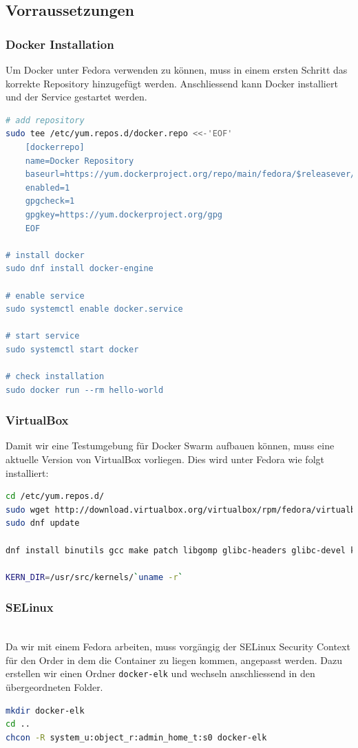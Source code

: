 \subsection{Vorraussetzungen}
\subsubsection{Docker Installation}
Um Docker unter Fedora verwenden zu können, muss in einem ersten Schritt das korrekte Repository hinzugefügt werden. Anschliessend kann Docker installiert und der Service gestartet werden.
\begin{lstlisting}[language=bash]
# add repository
sudo tee /etc/yum.repos.d/docker.repo <<-'EOF'
	[dockerrepo]
	name=Docker Repository
	baseurl=https://yum.dockerproject.org/repo/main/fedora/$releasever/
	enabled=1
	gpgcheck=1
	gpgkey=https://yum.dockerproject.org/gpg
	EOF

# install docker
sudo dnf install docker-engine

# enable service
sudo systemctl enable docker.service

# start service
sudo systemctl start docker

# check installation
sudo docker run --rm hello-world
\end{lstlisting}

\subsubsection{VirtualBox}
Damit wir eine Testumgebung für Docker Swarm aufbauen können, muss eine aktuelle Version von VirtualBox vorliegen.  Dies wird unter Fedora wie folgt installiert:
\begin{lstlisting}[language=bash]
cd /etc/yum.repos.d/ 
sudo wget http://download.virtualbox.org/virtualbox/rpm/fedora/virtualbox.repo
sudo dnf update

dnf install binutils gcc make patch libgomp glibc-headers glibc-devel kernel-headers kernel-devel dkms

KERN_DIR=/usr/src/kernels/`uname -r`
\end{lstlisting}


\subsubsection{SELinux} \hfill \\
Da wir mit einem Fedora arbeiten, muss vorgängig der SELinux Security Context für den Order in dem die Container zu liegen kommen, angepasst werden. Dazu erstellen wir einen Ordner \lstinline[]|docker-elk| und wechseln anschliessend in den übergeordneten Folder.
\begin{lstlisting}[language=bash]
mkdir docker-elk
cd ..
chcon -R system_u:object_r:admin_home_t:s0 docker-elk
\end{lstlisting}

